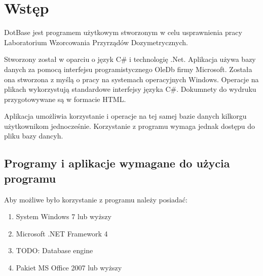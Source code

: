 
\rozdzial


\section{Wstęp}

DotBase jest programem użytkowym stworzonym w celu usprawnienia pracy Laboratorium Wzorcowania Przyrządów Dozymetrycznych.

Stworzony został w oparciu o język C\# i technologię .Net. Aplikacja używa bazy danych za pomocą interfejsu programistycznego OleDb firmy Microsoft. Została ona stworzona z myślą o pracy na systemach operacyjnych Windows. Operacje na plikach wykorzystują standardowe interfejsy języka C\#. Dokumnety do wydruku przygotowywane są w formacie HTML.

Aplikacja umożliwia korzystanie i operacje na tej samej bazie danych kilkorgu użytkownikom jednocześnie. Korzystanie z programu wymaga jednak dostępu do pliku bazy dancyh.

\subsection{Programy i aplikacje wymagane do użycia programu}

Aby możliwe było korzystanie z programu należy posiadać:
\begin{enumerate}
	\item System Windows 7 lub wyższy
	\item Microsoft .NET Framework 4 	
	\item TODO: Database engine
	\item Pakiet MS Office 2007 lub wyższy
\end{enumerate}

